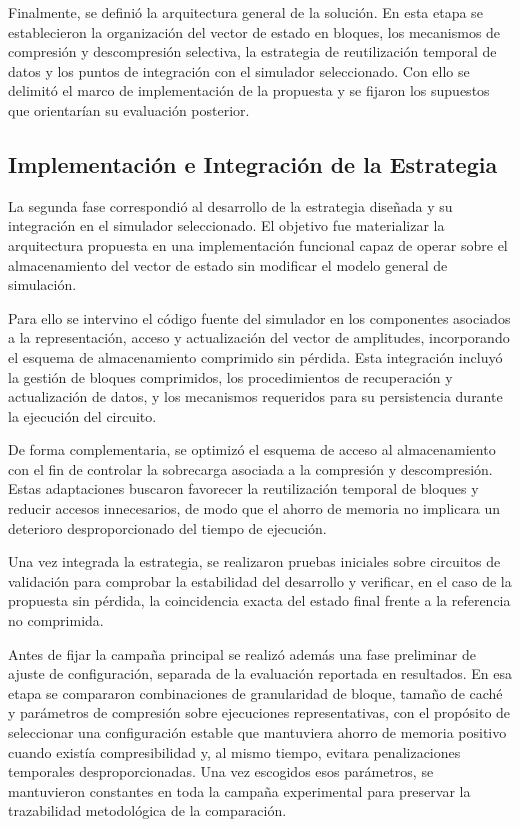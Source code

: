 Finalmente, se definió la arquitectura general de la solución. En esta etapa se
establecieron la organización del vector de estado en bloques, los mecanismos de
compresión y descompresión selectiva, la estrategia de reutilización temporal de datos
y los puntos de integración con el simulador seleccionado. Con ello se delimitó el
marco de implementación de la propuesta y se fijaron los supuestos que orientarían su
evaluación posterior.

\subsection{Implementación e Integración de la Estrategia}

La segunda fase correspondió al desarrollo de la estrategia diseñada y su integración en
el simulador seleccionado. El objetivo fue materializar la arquitectura propuesta en una
implementación funcional capaz de operar sobre el almacenamiento del vector de
estado sin modificar el modelo general de simulación.

Para ello se intervino el código fuente del simulador en los componentes asociados a la
representación, acceso y actualización del vector de amplitudes, incorporando el
esquema de almacenamiento comprimido sin pérdida. Esta integración incluyó la
gestión de bloques comprimidos, los procedimientos de recuperación y actualización de
datos, y los mecanismos requeridos para su persistencia durante la ejecución del
circuito.

De forma complementaria, se optimizó el esquema de acceso al almacenamiento con el
fin de controlar la sobrecarga asociada a la compresión y descompresión. Estas
adaptaciones buscaron favorecer la reutilización temporal de bloques y reducir accesos
innecesarios, de modo que el ahorro de memoria no implicara un deterioro desproporcionado
del tiempo de ejecución.

Una vez integrada la estrategia, se realizaron pruebas iniciales sobre circuitos de
validación para comprobar la estabilidad del desarrollo y verificar, en el caso de la
propuesta sin pérdida, la coincidencia exacta del estado final frente a la referencia no
comprimida.

Antes de fijar la campaña principal se realizó además una fase preliminar de ajuste de
configuración, separada de la evaluación reportada en resultados. En esa etapa se
compararon combinaciones de granularidad de bloque, tamaño de caché y parámetros de
compresión sobre ejecuciones representativas, con el propósito de seleccionar una
configuración estable que mantuviera ahorro de memoria positivo cuando existía
compresibilidad y, al mismo tiempo, evitara penalizaciones temporales desproporcionadas.
Una vez escogidos esos parámetros, se mantuvieron constantes en toda la campaña
experimental para preservar la trazabilidad metodológica de la comparación.

